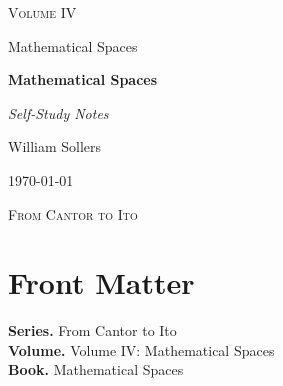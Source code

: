 \documentclass[12pt, a4paper]{report}
\begin{document}
\ExplSyntaxOff
\renewcommand{\familydefault}{\rmdefault}

\begin{titlepage}
\centering
\vspace*{3.5cm}

{\Large\scshape Volume IV\par}
\vspace{0.35cm}
{\large Mathematical Spaces\par}

\vspace{1.4cm}

{\Huge\bfseries Mathematical Spaces\par}

\vspace{0.6cm}
{\large\itshape Self-Study Notes\par}

\vfill

{\large William Sollers\par}
\vspace{0.35cm}
{\large \today\par}

\vfill

{\large\scshape From Cantor to Ito\par}
\end{titlepage}

\clearpage
\thispagestyle{plain}
\chapter*{Front Matter}
\noindent\textbf{Series.} From Cantor to Ito\\[0.5em]
\textbf{Volume.} Volume IV: Mathematical Spaces\\[0.5em]
\textbf{Book.} Mathematical Spaces

\clearpage
\tableofcontents
\clearpage
{}



\clearpage



\printindex[tech]
\printindex[dep]
\end{document}
